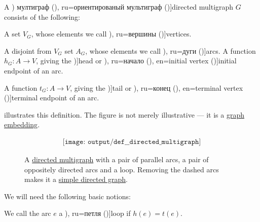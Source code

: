 \begin{definition}\label{def:directed_multigraph}
  A \term[bg=ориентиран (\cite[6]{Мирчев2001}) мултиграф (\cite[7]{Мирчев2001}), ru=ориентированый мультиграф (\cite[16]{Емеличев1990})]{directed multigraph} \( G \) consists of the following:
  \begin{thmenum}[series=def:directed_multigraph]
     A set \( V_G \), whose elements we call \term[bg=върхове (\cite[6]{Мирчев2001}), ru=вершины (\cite[279]{Емеличев1990})]{vertices}.

     A disjoint from \( V_G \) set \( A_G \), whose elements we call \term[bg=дъги (\cite[6]{Мирчев2001}), ru=дуги (\cite[279]{Емеличев1990})]{arcs}.
     A function \( h_G: A \to V \), giving the \term[en=head (\cite[544]{Rosen1999})]{head} or \term[bg=начален връх (\cite[7]{Мирчев2001}), ru=начало (\cite[279]{Емеличев1990}), en=initial vertex (\cite[28]{Diestel2005})]{initial endpoint} of an arc.

     A function \( t_G: A \to V \), giving the \term[en=tail (\cite[544]{Rosen1999})]{tail} or \term[bg=краен връх (\cite[7]{Мирчев2001}), ru=конец (\cite[279]{Емеличев1990}), en=terminal vertex (\cite[28]{Diestel2005})]{terminal endpoint} of an arc.
  \end{thmenum}

   illustrates this definition. The figure is not merely illustrative --- it is a \hyperref[def:graph_geometric_realization/embedding]{graph embedding}.

  \begin{figure}[!ht]
    \begin{equation}\label{eq:fig:def:directed_multigraph}
      \begin{aligned}
        \texttt{[image: output/def\_\_directed\_multigraph]}
      \end{aligned}
    \end{equation}
    \caption{A \hyperref[def:directed_multigraph]{directed multigraph} with a pair of parallel arcs, a pair of oppositely directed arcs and a loop. Removing the dashed arcs makes it a \hyperref[def:directed_graph]{simple directed graph}.}\label{fig:def:directed_multigraph}
  \end{figure}

  We will need the following basic notions:
  \begin{thmenum}[resume=def:directed_multigraph]
     We call the arc \( e \) a \term[bg=примка (\cite[7]{Мирчев2001}), ru=петля (\cite[279]{Емеличев1990})]{loop} if \( h(e) = t(e) \).


\end{thmenum}
\end{definition}
